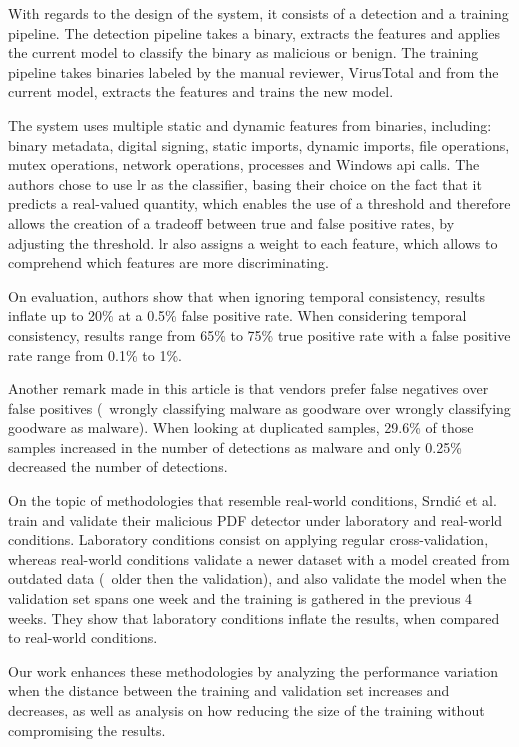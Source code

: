 With regards to the design of the system, it consists of a detection and a training pipeline.
The detection pipeline takes a binary, extracts the features and applies the current model to classify the binary as malicious or benign.
The training pipeline takes binaries labeled by the manual reviewer, VirusTotal and from the current model, extracts the features and trains the new model.

The system uses multiple static and dynamic features from binaries, including: binary metadata, digital signing, static imports, dynamic imports, file operations, mutex operations, network operations, processes and Windows \gls{api} calls.
The authors chose to use \acrfull{lr} as the classifier, basing their choice on the fact that it predicts a real-valued quantity, which enables the use of a threshold and therefore allows the creation of a tradeoff between true and false positive rates, by adjusting the threshold.
\gls{lr} also assigns a weight to each feature, which allows to comprehend which features are more discriminating.

On evaluation, authors show that when ignoring temporal consistency, results inflate up to 20\% at a 0.5\% false positive rate.
When considering temporal consistency, results range from 65\% to 75\% true positive rate with a false positive rate range from 0.1\% to 1\%.

Another remark made in this article is that vendors prefer false negatives over false positives (\ie\ wrongly classifying malware as goodware over wrongly classifying goodware as malware).
When looking at duplicated samples, 29.6\% of those samples increased in the number of detections as malware and only 0.25\% decreased the number of detections.

\medskip

On the topic of methodologies that resemble real-world conditions, Srndi\'c et al.~\cite{vsrndic2013detection} train and validate their malicious PDF detector under laboratory and real-world conditions.
Laboratory conditions consist on applying regular cross-validation, whereas real-world conditions validate a newer dataset with a model created from outdated data (\ie\ older then the validation), and also validate the model when the validation set spans one week and the training is gathered in the previous 4 weeks.
They show that laboratory conditions inflate the results, when compared to real-world conditions.

Our work enhances these methodologies by analyzing the performance variation when the distance between the training and validation set increases and decreases, as well as analysis on how reducing the size of the training without compromising the results.

